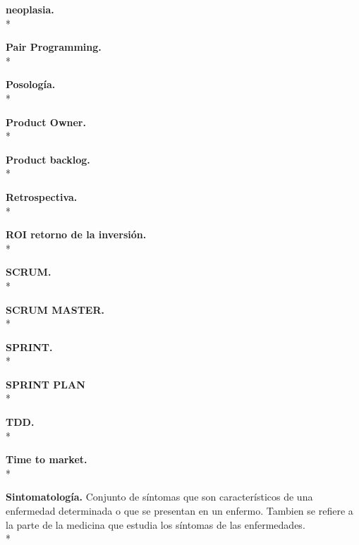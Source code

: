\documentclass[../pfc.tex]{subfiles}
\begin{document}
		\textbf{neoplasia.}\\*
		
		\textbf{Pair Programming.}\\*
		
		\textbf{Posología.}\\*
		
		\textbf{Product Owner.}\\*
		
		\textbf{Product backlog.}\\*
		
		\textbf{Retrospectiva.}\\*
		
		\textbf{ROI retorno de la inversión.}\\*
		
		\textbf{SCRUM.}\\*
		
		\textbf{SCRUM MASTER.}\\*
		
		\textbf{SPRINT.}\\*
		
		\textbf{SPRINT PLAN}\\*
		
		\textbf{TDD.}\\*
		
		\textbf{Time to market.}\\*
		
		\textbf{Sintomatología.}
		Conjunto de síntomas que son característicos de una enfermedad determinada o que se presentan en un enfermo.
		Tambien se refiere a la parte de la medicina que estudia los síntomas de las enfermedades.\\*
		
		
		
	
	
\end{document}
